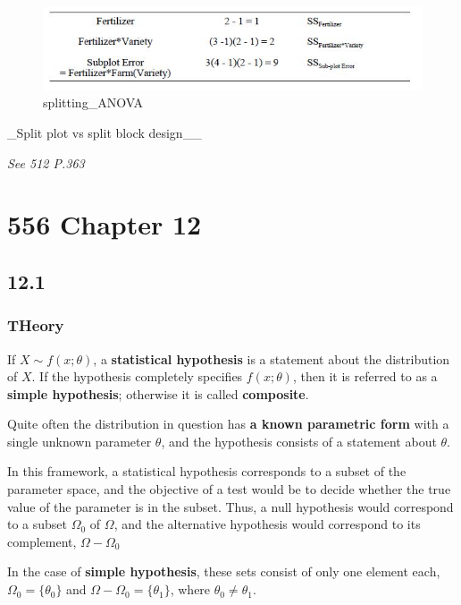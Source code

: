 \documentclass[]{book}
\begin{document}
\begin{figure}
\centering
\includegraphics{splitting_ANOVA.jpg}
\caption{splitting\_ANOVA}
\end{figure}

\_Split plot vs split block design\_\_

\emph{See 512 P.363}

\hypertarget{chapter-12}{%
\chapter{556 Chapter 12}\label{chapter-12}}

\hypertarget{section-4}{%
\section{12.1}\label{section-4}}

\hypertarget{theory}{%
\subsection{THeory}\label{theory}}

If \(X \sim f(x;\theta)\), a \textbf{statistical hypothesis} is a statement about the distribution of \(X\). If the hypothesis completely specifies \(f(x;\theta)\), then it is referred to as a \textbf{simple hypothesis}; otherwise it is called \textbf{composite}.

Quite often the distribution in question has \textbf{a known parametric form} with a single unknown parameter \(\theta\), and the hypothesis consists of a statement about \(\theta\).

In this framework, a statistical hypothesis corresponds to a subset of the parameter space, and the objective of a test would be to decide whether the true value of the parameter is in the subset. Thus, a null hypothesis would correspond to a subset \(\Omega_0\) of \(\Omega\), and the alternative hypothesis would correspond to its complement, \(\Omega-\Omega_0\)

In the case of \textbf{simple hypothesis}, these sets consist of only one element each, \(\Omega_0=\{ \theta_0\}\) and \(\Omega -\Omega_0=\{ \theta_1\}\), where \(\theta_0 \neq \theta_1\).
\end{document}
